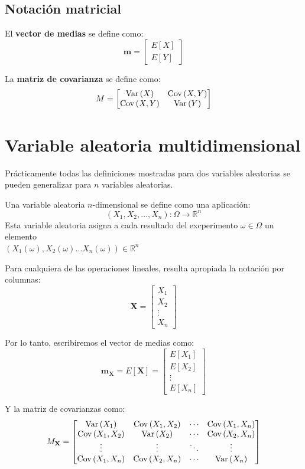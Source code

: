 \documentclass[a4paper]{book}
\renewcommand{\vec}[1]{\mathbf{#1}} %
\begin{document}
\subsection{Notación matricial}
El \textbf{vector de medias} se define como:
\[ \vec{m} = \left[ 
\begin{matrix}
	E \left[ X \right]\\ 
	E \left[ Y \right]
\end{matrix} \right] \]

La \textbf{matriz de covarianza} se define como:
\[M=\left[ 
\begin{matrix}
	\operatorname{Var} \left( X \right)& \operatorname{Cov} \left( X,Y \right)\\ 
	\operatorname{Cov} \left( X,Y \right)& \operatorname{Var} \left( Y \right)
\end{matrix} \right]\]

\section{Variable aleatoria multidimensional}

Prácticamente todas las definiciones mostradas para dos variables aleatorias se pueden generalizar para $n$ variables aleatorias.

Una variable aleatoria $n$-dimensional se define como una aplicación:
\[\left( X_1,X_2,\dots , X_n \right):\Omega \longrightarrow \mathbb{R}^n\]
Esta variable aleatoria asigna a cada resultado del excperimento $\omega \in \Omega$ un elemento\\ $\left( X_1(\omega ), X_2(\omega ) \dots X_n (\omega )\right)\in \mathbb{R}^n$

Para cualquiera de las operaciones lineales, resulta apropiada la notación por columnas:
\[\vec{X} = \left[ 
\begin{matrix}
	X_1\\ 
	X_2\\ 
	\vdots \\ 
	X_n
\end{matrix} \right]\]

Por lo tanto, escribiremos el vector de medias como:
\[\vec{m}_{\vec{X}} = E \left[ \vec{X} \right]= \left[ 
\begin{matrix}
	E \left[ X_1 \right]\\ 
	E \left[ X_2 \right]\\ 
	\vdots \\ 
	E \left[ X_n \right]
\end{matrix} \right] \]

Y la matriz de covarianzas como:
\[ M_{\vec{X}} = \left[ 
\begin{matrix}
	\Var \left( X_1 \right) & \Cov \left( X_1, X_2 \right) & \cdots & \Cov \left( X_1, X_n \right)\\ 
	\Cov \left( X_1, X_2 \right) & \Var \left( X_2 \right) & \cdots & \Cov \left( X_2, X_n \right)\\ 
	\vdots & \vdots & \ddots & \vdots \\
	\Cov \left( X_1,X_n \right) & \Cov \left( X_2, X_n \right) & \cdots & \Var \left( X_n \right)
\end{matrix} \right]\]
\end{document}

